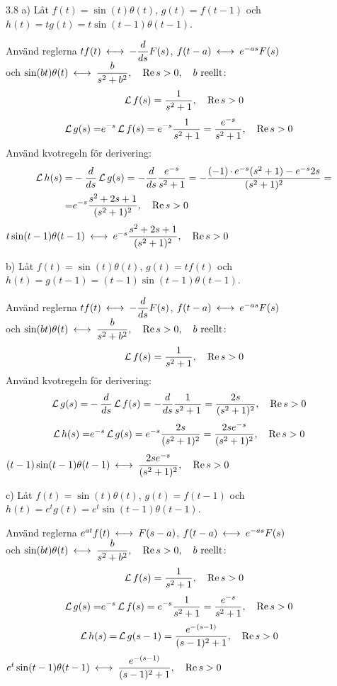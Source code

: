 \begin{task}{3.8 a)}
	Låt $f(t)=\sin(t)\theta(t)$, $g(t)=f(t-1)$ och $h(t)=tg(t)=t\sin(t-1)\theta(t-1)$.
	
	Använd reglerna $tf(t) \llra -\dfrac{d}{ds}F(s)$, $f(t-a)\llra e^{-as}F(s)$ \\
	och $\sin(bt)\theta(t)\llra\dfrac{b}{s^2+b^2}\cond{\Re s > 0}\cond{b\text{ reellt}}$:
	\[\operatorname{\mathcal{L}} f(s)=\frac{1}{s^2+1}, \quad \operatorname{Re} s > 0\]
	\begin{align*}
	\operatorname{\mathcal{L}} g(s)=
	&e^{-s}\operatorname{\mathcal{L}} f(s)=
	e^{-s}\frac{1}{s^2+1}=
	\frac{e^{-s}}{s^2+1}, \quad \operatorname{Re} s > 0
	\end{align*}
	Använd kvotregeln för derivering:
	\begin{align*}
	\operatorname{\mathcal{L}} h(s)=
	&-\frac{d}{ds}\operatorname{\mathcal{L}} g(s)=
	-\frac{d}{ds}\frac{e^{-s}}{s^2+1}=
	-\frac{(-1)\operatorname{\cdot}e^{-s}(s^2+1)-e^{-s}2s}{(s^2+1)^2}= \\ =
	&e^{-s}\frac{s^2+2s+1}{(s^2+1)^2}, \quad \operatorname{Re} s > 0
	\end{align*}
	\ans $t\sin(t-1)\theta(t-1) \llra e^{-s}\dfrac{s^2+2s+1}{(s^2+1)^2}\cond{\Re s > 0}$
\end{task}

\pagebreak
\begin{task}{b)}
	Låt $f(t)=\sin(t)\theta(t)$, $g(t)=tf(t)$ och $h(t)=g(t-1)=(t-1)\sin(t-1)\theta(t-1)$.
	
	Använd reglerna $tf(t) \llra -\dfrac{d}{ds}F(s)$, $f(t-a)\llra e^{-as}F(s)$ \\
	och $\sin(bt)\theta(t)\llra\dfrac{b}{s^2+b^2}\cond{\Re s > 0}\cond{b\text{ reellt}}$:
	\[\operatorname{\mathcal{L}} f(s)=\frac{1}{s^2+1}, \quad \operatorname{Re} s > 0\]
	Använd kvotregeln för derivering:
	\begin{align*}
	\operatorname{\mathcal{L}} g(s)=
	&-\frac{d}{ds}\operatorname{\mathcal{L}} f(s)=
	-\frac{d}{ds}\frac{1}{s^2+1}=
	\frac{2s}{(s^2+1)^2}, \quad \operatorname{Re} s > 0
	\end{align*}
	\begin{align*}
	\operatorname{\mathcal{L}} h(s)=
	&e^{-s}\operatorname{\mathcal{L}} g(s)=
	e^{-s}\frac{2s}{(s^2+1)^2}=
	\frac{2se^{-s}}{(s^2+1)^2}, \quad \operatorname{Re} s > 0
	\end{align*}
	\ans $(t-1)\sin(t-1)\theta(t-1) \llra \dfrac{2se^{-s}}{(s^2+1)^2}\cond{\Re s > 0}$
\end{task}

\begin{task}{c)}
	Låt $f(t)=\sin(t)\theta(t)$, $g(t)=f(t-1)$ och $h(t)=e^{t}g(t)=e^{t}\sin(t-1)\theta(t-1)$.
	
	Använd reglerna $e^{at}f(t) \llra F(s-a)$, $f(t-a)\llra e^{-as}F(s)$ \\
	och $\sin(bt)\theta(t)\llra\dfrac{b}{s^2+b^2}\cond{\Re s > 0}\cond{b\text{ reellt}}$:
	\[\operatorname{\mathcal{L}} f(s)=\frac{1}{s^2+1}, \quad \operatorname{Re} s > 0\]
	\begin{align*}
	\operatorname{\mathcal{L}} g(s)=
	&e^{-s}\operatorname{\mathcal{L}} f(s)=
	e^{-s}\frac{1}{s^2+1}=
	\frac{e^{-s}}{s^2+1}, \quad \operatorname{Re} s > 0
	\end{align*}
	\begin{align*}
	\operatorname{\mathcal{L}} h(s)=
	&\operatorname{\mathcal{L}} g(s-1)=
	\frac{e^{-(s-1)}}{(s-1)^2+1}, \quad \operatorname{Re} s > 0
	\end{align*}
	\ans $e^{t}\sin(t-1)\theta(t-1) \llra \dfrac{e^{-(s-1)}}{(s-1)^2+1}\cond{\Re s > 0}$
\end{task}

